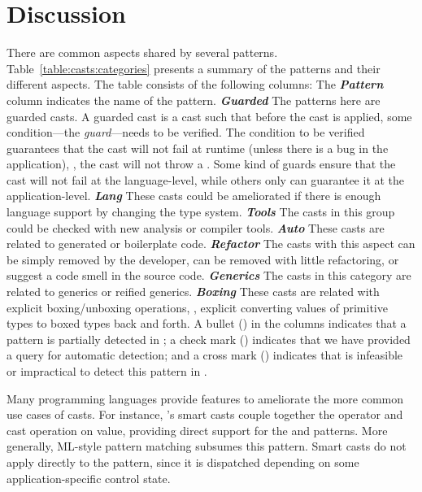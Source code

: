 \section{Discussion}\label{sec:casts:discussion}

\newcommand{\gh}[1]{\emph{\textbf{#1}}}
There are common aspects shared by several patterns.
Table~\ref{table:casts:categories} presents a summary of the patterns and their different aspects.
The table consists of the following columns:
The \gh{Pattern} column indicates the name of the pattern.
\gh{Guarded} The patterns here are guarded casts.
A guarded cast is a cast such that before the cast is applied,
some condition---the \emph{guard}---needs to be verified.
The condition to be verified guarantees that the cast will not fail at runtime (unless there is a bug in the application), \ie,
the cast will not throw a .
Some kind of guards ensure that the cast will not fail at the language-level,
while others only can guarantee it at the application-level.
\gh{Lang} These casts could be ameliorated if there is enough language support by changing the type system.
\gh{Tools} The casts in this group could be checked with new analysis or compiler tools.
\gh{Auto} These casts are related to generated or boilerplate code.
\gh{Refactor} The casts with this aspect can be simply removed by the developer,
can be removed with little refactoring,
or suggest a code smell in the source code.
\gh{Generics} The casts in this category are related to generics or reified generics.
\gh{Boxing} These casts are related with explicit boxing/unboxing operations, \ie{},
explicit converting values of primitive types to boxed types back and forth.
\gh{\ql{}}
A bullet (\exis{}) in the \ql{} columns indicates that a pattern is partially detected in \ql{};
a check mark (\tick{}) indicates that we have provided a \ql{} query for automatic detection; and
a cross mark (\xmark{}) indicates that is infeasible or impractical to detect this pattern in \ql{}.



Many programming languages provide features to ameliorate the more common use cases of casts.
For instance,
\kotlin{}'s smart casts couple together the  operator and cast operation on value, 
providing direct support for the  and  patterns.
More generally, ML-style pattern matching subsumes this pattern.
Smart casts do not apply directly to the  pattern,
since it is dispatched depending on some application-specific control state.

